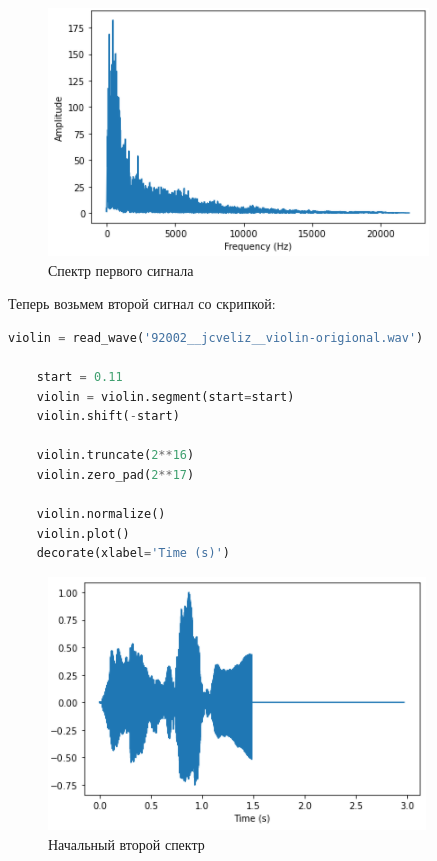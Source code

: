 \documentclass[a4paper]{article}
\begin{document}
            \begin{figure}[H]
                \centering
                \includegraphics{ex_1_2.png}
                \caption{Спектр первого сигнала}
                \label{fig:ex_1_2}
            \end{figure}
            
            Теперь возьмем второй сигнал со скрипкой:
            
\begin{lstlisting}[language=Python, caption= Получение второго сигнала]
    violin = read_wave('92002__jcveliz__violin-origional.wav')

    start = 0.11
    violin = violin.segment(start=start)
    violin.shift(-start)
    
    violin.truncate(2**16)
    violin.zero_pad(2**17)
    
    violin.normalize()
    violin.plot()
    decorate(xlabel='Time (s)')
\end{lstlisting}
            
            \begin{figure}[H]
                \centering
                \includegraphics{ex_1_3.png}
                \caption{Начальный второй спектр}
                \label{fig:ex_1_3}
            \end{figure}
            
\end{document}
